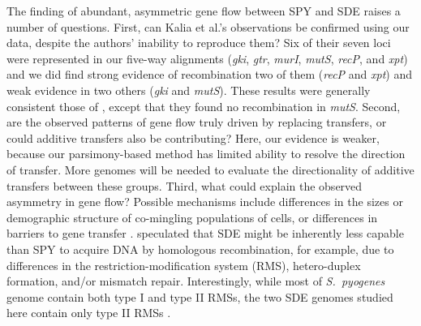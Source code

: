 \documentclass[12pt]{article}
\begin{document}
The finding of abundant, asymmetric gene flow between
SPY and SDE raises a number of questions.
First, can Kalia et al.'s \citeyearpar{Kalia2001} observations be
confirmed using our data, despite the authors' inability to reproduce them?
Six of their seven loci were represented in our five-way alignments
(\textit{gki}, \textit{gtr}, 
\textit{murI}, \textit{mutS}, \textit{recP}, and \textit{xpt}) 
and we did find 
strong evidence of recombination two of them 
(\textit{recP} and \textit{xpt}) and weak evidence in two others
(\textit{gki} and \textit{mutS}).  
These results were generally consistent those of \citet{Kalia2001}, except
that they found no recombination in {\em mutS}.
% 
%
%
%
%
%
%
%
Second, are the observed patterns of gene flow truly driven by replacing
transfers, or could additive transfers also be contributing?  Here, our
evidence is weaker, because our parsimony-based method has limited ability
to resolve the direction of transfer.  
More genomes will be needed to
evaluate the directionality of additive transfers between these groups.
Third, what could explain the observed asymmetry in gene flow?  Possible
mechanisms include differences in the sizes or demographic structure of
co-mingling populations of cells, or differences in barriers to gene
transfer \citep{Thomas2005}.  \cite{Kalia2001} speculated that 
SDE might be inherently less capable than SPY to acquire DNA by homologous
recombination, for example, due to differences in the 
restriction-modification system (RMS), hetero-duplex formation, and/or mismatch
repair.  
Interestingly,
while most of \textit{S.\ pyogenes} genome contain both type I and type II
RMSs, the two SDE genomes studied here contain
only type II RMSs \citep{Roberts2010}.
\end{document}
